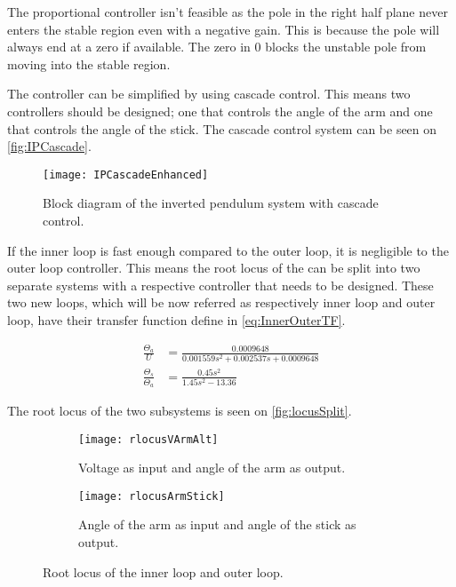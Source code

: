 The proportional controller isn't feasible as the pole in the right half plane never enters the stable region even with a negative gain. This is because the pole will always end at a zero if available. The zero in 0 blocks the unstable pole from moving into the stable region.

The controller can be simplified by using cascade control. This means two controllers should be designed; one that controls the angle of the arm and one that controls the angle of the stick. The cascade control system can be seen on \autoref{fig:IPCascade}.

\begin{figure}[htbp]
\centering
\texttt{[image: IPCascadeEnhanced]}
\caption{Block diagram of the inverted pendulum system with cascade control.}
\label{fig:IPCascade}
\end{figure}

If the inner loop is fast enough compared to the outer loop, it is negligible to the outer loop controller. This means the root locus of the can be split into two separate systems with a respective controller that needs to be designed. These two new loops, which will be now referred as respectively inner loop and outer loop, have their transfer function define in \autoref{eq:InnerOuterTF}.

\begin{subequations}\label{eq:InnerOuterTF}
	\begin{flalign}
		\frac{\Theta_a}{U}&= \frac{0.0009648}{0.001559 s^2 + 0.002537 s + 0.0009648}\\
		\frac{\Theta_s}{\Theta_a}&=\frac{0.45 s^2}{1.45 s^2 - 13.36}
	\end{flalign}
\end{subequations}

The root locus of the two subsystems is seen on \autoref{fig:locusSplit}.
\begin{figure}[htbp]
\centering
	\begin{subfigure}{0.45\textwidth}
	\texttt{[image: rlocusVArmAlt]}
	\caption{Voltage as input and angle of the arm as output.}
	\label{fig:locusVArm}
	\end{subfigure}
	\begin{subfigure}{0.45\textwidth}
	\texttt{[image: rlocusArmStick]}
	\caption{Angle of the arm as input and angle of the stick as output.}
	\end{subfigure}
\caption{Root locus of the inner loop and outer loop.}
\label{fig:locusSplit}
\end{figure}

